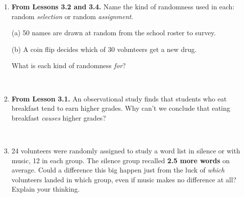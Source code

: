 \documentclass[12pt]{article}
\begin{document}

\vspace{0.28in}

\begin{enumerate}[leftmargin=1.9em, itemsep=0.42in]

  \item \textbf{From Lessons 3.2 and 3.4.} Name the kind of randomness used in each: random
        \emph{selection} or random \emph{assignment}.

        \vspace{10pt}
        (a) 50 names are drawn at random from the school roster to survey. \hfill \blank{3.8cm}

        \vspace{10pt}
        (b) A coin flip decides which of 30 volunteers get a new drug. \hfill \blank{3.8cm}

        \vspace{12pt}
        What is each kind of randomness \emph{for}?
        \vspace{12pt}

        \writeline\\[18pt]\writeline

  \item \textbf{From Lesson 3.1.} An observational study finds that students who eat breakfast
        tend to earn higher grades. Why can't we conclude that eating breakfast \emph{causes}
        higher grades?

        \vspace{12pt}
        \writeline\\[18pt]\writeline

  \item 24 volunteers were randomly assigned to study a word list in silence or with music, 12
        in each group. The silence group recalled \textbf{2.5 more words} on average. Could a
        difference this big happen just from the luck of \emph{which} volunteers landed in
        which group, even if music makes no difference at all? Explain your thinking.

        \vspace{12pt}
        \writeline\\[18pt]\writeline\\[18pt]\writeline

\end{enumerate}
\end{document}
